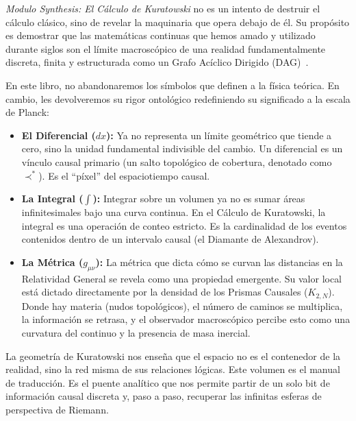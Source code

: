 \documentclass[11pt, a4paper, openany]{book}
\newcommand{\covers}{\prec^{\!*}}
\begin{document}
\bigskip

\textit{Modulo Synthesis: El C\'alculo de Kuratowski} no es un intento de
destruir el c\'alculo cl\'asico, sino de revelar la maquinaria que opera
debajo de \'el. Su prop\'osito es demostrar que las matem\'aticas
continuas que hemos amado y utilizado durante siglos son el l\'imite
macrosc\'opico de una realidad fundamentalmente discreta, finita y
estructurada como un Grafo Ac\'iclico Dirigido
(DAG)~\cite{bombelli1987,finkelstein1969,thooft1979}.

En este libro, no abandonaremos los s\'imbolos que definen a la
f\'isica te\'orica. En cambio, les devolveremos su rigor ontol\'ogico
redefiniendo su significado a la escala de Planck:

\begin{itemize}
  \item \textbf{El Diferencial ($dx$):} Ya no representa un l\'imite
    geom\'etrico que tiende a cero, sino la unidad fundamental
    indivisible del cambio. Un diferencial es un v\'inculo causal
    primario (un salto topol\'ogico de cobertura, denotado como
    $\covers$). Es el ``p\'ixel'' del espaciotiempo causal.

  \item \textbf{La Integral ($\int$):} Integrar sobre un volumen ya no
    es sumar \'areas infinitesimales bajo una curva continua. En el
    C\'alculo de Kuratowski, la integral es una operaci\'on de conteo
    estricto. Es la cardinalidad de los eventos contenidos dentro de un
    intervalo causal (el Diamante de Alexandrov).

  \item \textbf{La M\'etrica ($g_{\mu\nu}$):} La m\'etrica que dicta
    c\'omo se curvan las distancias en la Relatividad General se revela
    como una propiedad emergente. Su valor local est\'a dictado
    directamente por la densidad de los Prismas Causales ($K_{2,N}$).
    Donde hay materia (nudos topol\'ogicos), el n\'umero de caminos se
    multiplica, la informaci\'on se retrasa, y el observador
    macrosc\'opico percibe esto como una curvatura del continuo y la
    presencia de masa inercial.
\end{itemize}

\bigskip

La geometr\'ia de Kuratowski nos ense\~na que el espacio no es el
contenedor de la realidad, sino la red misma de sus relaciones l\'ogicas.
Este volumen es el manual de traducci\'on. Es el puente anal\'itico que
nos permite partir de un solo bit de informaci\'on causal discreta y,
paso a paso, recuperar las infinitas esferas de perspectiva de Riemann.
\end{document}
